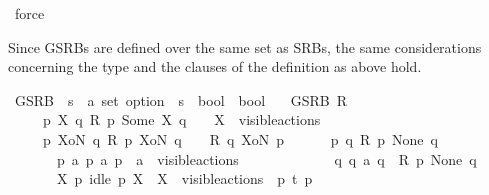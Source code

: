 \begin{isabellebody}
\ force%
\endisatagproof
{\isafoldproof}%
%
\isadelimproof
%
\endisadelimproof
%
\isadelimdocument
%
\endisadelimdocument
%
\isatagdocument
%
\isamarkuptrue%
%
\endisatagdocument
{\isafolddocument}%
%
\isadelimdocument
%
\endisadelimdocument
%
\begin{isamarkuptext}%
Since GSRBs are defined over the same set as SRBs, the same considerations concerning the type and the clauses of the definition as above hold.%
\end{isamarkuptext}\isamarkuptrue%
%
\isanewline
{}\isamarkupfalse%
\ GSRB\ {\isacharcolon}{\kern0pt}{\isacharcolon}{\kern0pt}\ {\isacartoucheopen}{\isacharparenleft}{\kern0pt}{\isacharprime}{\kern0pt}s\ {\isasymRightarrow}\ {\isacharprime}{\kern0pt}a\ set\ option\ {\isasymRightarrow}\ {\isacharprime}{\kern0pt}s\ {\isasymRightarrow}\ bool{\isacharparenright}{\kern0pt}\ {\isasymRightarrow}\ bool{\isacartoucheclose}\isanewline
\ \ \ {\isacartoucheopen}GSRB\ R\ {\isasymequiv}\isanewline
\ \ \ \ {\isacharparenleft}{\kern0pt}{\isasymforall}\ p\ X\ q{\isachardot}{\kern0pt}\ R\ p\ {\isacharparenleft}{\kern0pt}Some\ X{\isacharparenright}{\kern0pt}\ q\ \ {\isasymlongrightarrow}\ \ X\ {\isasymsubseteq}\ visible{\isacharunderscore}{\kern0pt}actions{\isacharparenright}{\kern0pt}\ {\isasymand}\isanewline
\ \ \ \ {\isacharparenleft}{\kern0pt}{\isasymforall}\ p\ XoN\ q{\isachardot}{\kern0pt}\ R\ p\ XoN\ q\ \ {\isasymlongrightarrow}\ \ R\ q\ XoN\ p{\isacharparenright}{\kern0pt}\ {\isasymand}\isanewline
\isanewline
\ \ \ \ {\isacharparenleft}{\kern0pt}{\isasymforall}\ p\ q{\isachardot}{\kern0pt}\ R\ p\ None\ q\ {\isasymlongrightarrow}\isanewline
\ \ \ \ \ \ {\isacharparenleft}{\kern0pt}{\isasymforall}\ p{\isacharprime}{\kern0pt}\ a{\isachardot}{\kern0pt}\ p\ {\isasymlongmapsto}a\ p{\isacharprime}{\kern0pt}\ {\isasymand}\ a\ {\isasymin}\ visible{\isacharunderscore}{\kern0pt}actions\ {\isasymunion}\ {\isacharbraceleft}{\kern0pt}{\isasymtau}{\isacharbraceright}{\kern0pt}\ \ {\isasymlongrightarrow}\isanewline
\ \ \ \ \ \ \ \ {\isacharparenleft}{\kern0pt}{\isasymexists}\ q{\isacharprime}{\kern0pt}{\isachardot}{\kern0pt}\ q\ {\isasymlongmapsto}a\ q{\isacharprime}{\kern0pt}\ {\isasymand}\ R\ p{\isacharprime}{\kern0pt}\ None\ q{\isacharprime}{\kern0pt}{\isacharparenright}{\kern0pt}{\isacharparenright}{\kern0pt}\ {\isasymand}\isanewline
\ \ \ \ \ \ {\isacharparenleft}{\kern0pt}{\isasymforall}\ X\ p{\isacharprime}{\kern0pt}{\isachardot}{\kern0pt}\ idle\ p\ X\ {\isasymand}\ X\ {\isasymsubseteq}\ visible{\isacharunderscore}{\kern0pt}actions\ {\isasymand}\ p\ {\isasymlongmapsto}t\ p{\isacharprime}{\kern0pt}\ \ {\isasymlongrightarrow}\ \ \isanewline

\end{isabellebody}
